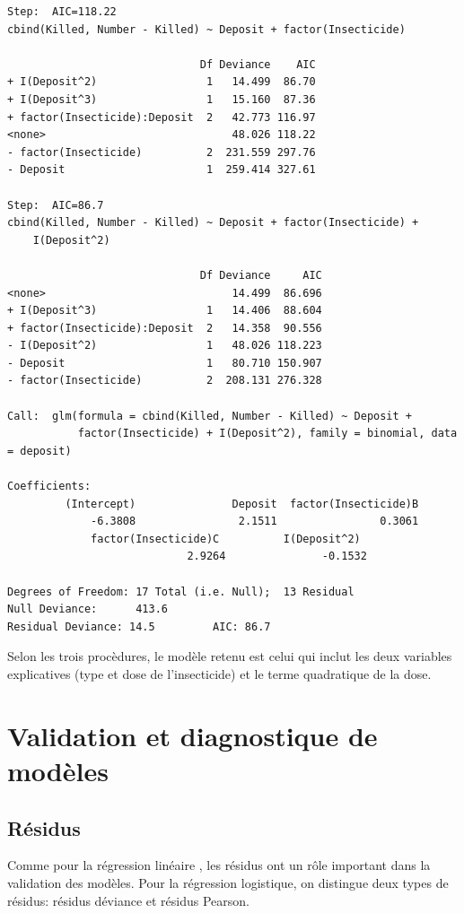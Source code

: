 \documentclass[11pt]{article}
\begin{document}
\begin{verbatim}
Step:  AIC=118.22
cbind(Killed, Number - Killed) ~ Deposit + factor(Insecticide)

                              Df Deviance    AIC
+ I(Deposit^2)                 1   14.499  86.70
+ I(Deposit^3)                 1   15.160  87.36
+ factor(Insecticide):Deposit  2   42.773 116.97
<none>                             48.026 118.22
- factor(Insecticide)          2  231.559 297.76
- Deposit                      1  259.414 327.61

Step:  AIC=86.7
cbind(Killed, Number - Killed) ~ Deposit + factor(Insecticide) + 
    I(Deposit^2)

                              Df Deviance     AIC
<none>                             14.499  86.696
+ I(Deposit^3)                 1   14.406  88.604
+ factor(Insecticide):Deposit  2   14.358  90.556
- I(Deposit^2)                 1   48.026 118.223
- Deposit                      1   80.710 150.907
- factor(Insecticide)          2  208.131 276.328

Call:  glm(formula = cbind(Killed, Number - Killed) ~ Deposit + 
           factor(Insecticide) + I(Deposit^2), family = binomial, data = deposit)

Coefficients:
         (Intercept)               Deposit  factor(Insecticide)B  
             -6.3808                2.1511                0.3061 
             factor(Insecticide)C          I(Deposit^2)  
                            2.9264               -0.1532  

Degrees of Freedom: 17 Total (i.e. Null);  13 Residual
Null Deviance:      413.6 
Residual Deviance: 14.5         AIC: 86.7
\end{verbatim}

\noindent Selon les trois procèdures, le modèle retenu est celui qui inclut les deux variables explicatives (type et dose de l'insecticide) et le terme quadratique de la dose.

\section{Validation et diagnostique de modèles}

\subsection{Résidus}

Comme pour la régression linéaire , les résidus ont un r\^ole important dans la validation des modèles. Pour la régression logistique, on distingue deux types de résidus: résidus déviance et résidus Pearson.
\end{document}
